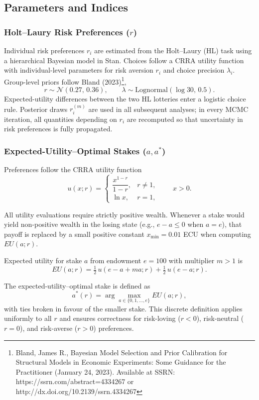\documentclass[11pt,a4paper]{article}
\numberwithin{equation}{section}
\begin{document}
\subsection{Parameters and Indices}
\label{App:Indices}

\subsubsection{Holt--Laury Risk Preferences ($r$)}
Individual risk preferences $r_i$ are estimated from the Holt--Laury (HL) task 
using a hierarchical Bayesian model in Stan. Choices follow a CRRA utility 
function with individual-level parameters for risk aversion $r_i$ and choice 
precision $\lambda_i$. Group-level priors follow Bland (2023)\footnote{
Bland, James R., Bayesian Model Selection and Prior Calibration for Structural Models in Economic Experiments: Some Guidance for the Practitioner (January 24, 2023). Available at SSRN: https://ssrn.com/abstract=4334267 or http://dx.doi.org/10.2139/ssrn.4334267
},
\[
r \sim \mathcal{N}(0.27,\,0.36), 
\qquad 
\lambda \sim \mathrm{Lognormal}(\log 30,\,0.5).
\]
Expected-utility differences between the two HL lotteries enter a logistic 
choice rule. Posterior draws $r_i^{(m)}$ are used in all subsequent analyses; 
in every MCMC iteration, all quantities depending on $r_i$ are recomputed so 
that uncertainty in risk preferences is fully propagated.\\


\subsubsection{Expected-Utility--Optimal Stakes ($a,a^*$)}

Preferences follow the CRRA utility function
\[
u(x; r) =
\begin{cases}
	\dfrac{x^{1-r}}{1-r}, & r \neq 1,\\[6pt]
	\ln x, & r = 1,
\end{cases}
\qquad x>0.
\]

All utility evaluations require strictly positive wealth. Whenever a stake
would yield non-positive wealth in the losing state (e.g., $e-a \le 0$ when
$a=e$), that payoff is replaced by a small positive constant
$x_{\min}=0.01$ ECU when computing $EU(a;r)$.

Expected utility for stake $a$ from endowment $e=100$ with multiplier $m>1$ is
\[
EU(a; r)
= \tfrac{1}{2}\,u(e - a + m a; r)
+ \tfrac{1}{2}\,u(e - a; r).
\]

The expected-utility--optimal stake is defined as
\[
a^*(r)
= \arg\max_{a \in \{0,1,\dots,e\}} EU(a; r),
\]
with ties broken in favour of the smaller stake. This discrete definition
applies uniformly to all $r$ and ensures correctness for risk-loving
($r<0$), risk-neutral ($r=0$), and risk-averse ($r>0$) preferences.
\end{document}
